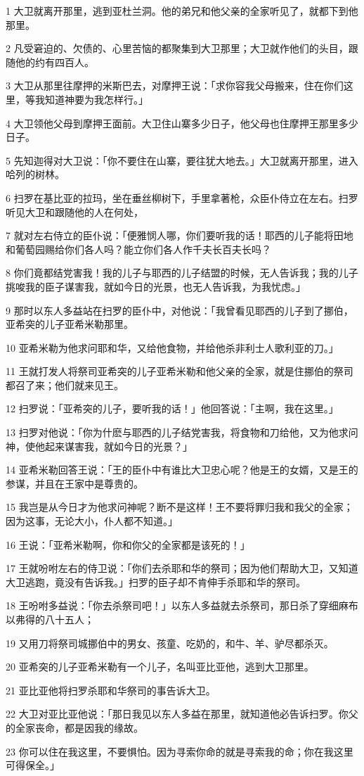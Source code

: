 \par 1 大卫就离开那里，逃到亚杜兰洞。他的弟兄和他父亲的全家听见了，就都下到他那里。
\par 2 凡受窘迫的、欠债的、心里苦恼的都聚集到大卫那里；大卫就作他们的头目，跟随他的约有四百人。
\par 3 大卫从那里往摩押的米斯巴去，对摩押王说：「求你容我父母搬来，住在你们这里，等我知道神要为我怎样行。」
\par 4 大卫领他父母到摩押王面前。大卫住山寨多少日子，他父母也住摩押王那里多少日子。
\par 5 先知迦得对大卫说：「你不要住在山寨，要往犹大地去。」大卫就离开那里，进入哈列的树林。
\par 6 扫罗在基比亚的拉玛，坐在垂丝柳树下，手里拿著枪，众臣仆侍立在左右。扫罗听见大卫和跟随他的人在何处，
\par 7 就对左右侍立的臣仆说：「便雅悯人哪，你们要听我的话！耶西的儿子能将田地和葡萄园赐给你们各人吗？能立你们各人作千夫长百夫长吗？
\par 8 你们竟都结党害我！我的儿子与耶西的儿子结盟的时候，无人告诉我；我的儿子挑唆我的臣子谋害我，就如今日的光景，也无人告诉我，为我忧虑。」
\par 9 那时以东人多益站在扫罗的臣仆中，对他说：「我曾看见耶西的儿子到了挪伯，亚希突的儿子亚希米勒那里。
\par 10 亚希米勒为他求问耶和华，又给他食物，并给他杀非利士人歌利亚的刀。」
\par 11 王就打发人将祭司亚希突的儿子亚希米勒和他父亲的全家，就是住挪伯的祭司都召了来；他们就来见王。
\par 12 扫罗说：「亚希突的儿子，要听我的话！」他回答说：「主啊，我在这里。」
\par 13 扫罗对他说：「你为什麽与耶西的儿子结党害我，将食物和刀给他，又为他求问神，使他起来谋害我，就如今日的光景？」
\par 14 亚希米勒回答王说：「王的臣仆中有谁比大卫忠心呢？他是王的女婿，又是王的参谋，并且在王家中是尊贵的。
\par 15 我岂是从今日才为他求问神呢？断不是这样！王不要将罪归我和我父的全家；因为这事，无论大小，仆人都不知道。」
\par 16 王说：「亚希米勒啊，你和你父的全家都是该死的！」
\par 17 王就吩咐左右的侍卫说：「你们去杀耶和华的祭司；因为他们帮助大卫，又知道大卫逃跑，竟没有告诉我。」扫罗的臣子却不肯伸手杀耶和华的祭司。
\par 18 王吩咐多益说：「你去杀祭司吧！」以东人多益就去杀祭司，那日杀了穿细麻布以弗得的八十五人；
\par 19 又用刀将祭司城挪伯中的男女、孩童、吃奶的，和牛、羊、驴尽都杀灭。
\par 20 亚希突的儿子亚希米勒有一个儿子，名叫亚比亚他，逃到大卫那里。
\par 21 亚比亚他将扫罗杀耶和华祭司的事告诉大卫。
\par 22 大卫对亚比亚他说：「那日我见以东人多益在那里，就知道他必告诉扫罗。你父的全家丧命，都是因我的缘故。
\par 23 你可以住在我这里，不要惧怕。因为寻索你命的就是寻索我的命；你在我这里可得保全。」

